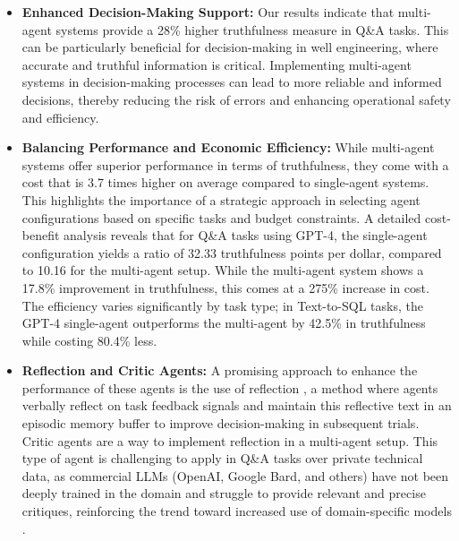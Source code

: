                 \begin{itemize}
                
                    \item \textbf{Enhanced Decision-Making Support:}
                        Our results indicate that multi-agent systems provide a 28\% higher truthfulness measure in Q\&A tasks. This can be particularly beneficial for decision-making in well engineering, where accurate and truthful information is critical.
                        Implementing multi-agent systems in decision-making processes can lead to more reliable and informed decisions, thereby reducing the risk of errors and enhancing operational safety and efficiency.
                    
                    \item \textbf{Balancing Performance and Economic Efficiency:}
                        While multi-agent systems offer superior performance in terms of truthfulness, they come with a cost that is 3.7 times higher on average compared to single-agent systems.
                        This highlights the importance of a strategic approach in selecting agent configurations based on specific tasks and budget constraints. 
                        A detailed cost-benefit analysis reveals that for Q\&A tasks using GPT-4, the single-agent configuration yields a ratio of 32.33 truthfulness points per dollar, compared to 10.16 for the multi-agent setup. While the multi-agent system shows a 17.8\% improvement in truthfulness, this comes at a 275\% increase in cost. The efficiency varies significantly by task type; in Text-to-SQL tasks, the GPT-4 single-agent outperforms the multi-agent by 42.5\% in truthfulness while costing 80.4\% less. 
                        
                    \item \textbf{Reflection and Critic Agents:}
                        A promising approach to enhance the performance of these agents is the use of reflection \citep{Shinn2023}, a method where agents verbally reflect on task feedback signals and maintain this reflective text in an episodic memory buffer to improve decision-making in subsequent trials. Critic agents are a way to implement reflection in a multi-agent setup. This type of agent is challenging to apply in Q\&A tasks over private technical data, as commercial LLMs (OpenAI, Google Bard, and others) have not been deeply trained in the domain and struggle to provide relevant and precise critiques, reinforcing the trend toward increased use of domain-specific models \citep{Shah2024, Meena2023, Ghosh2023}.                
                        

\end{itemize}
